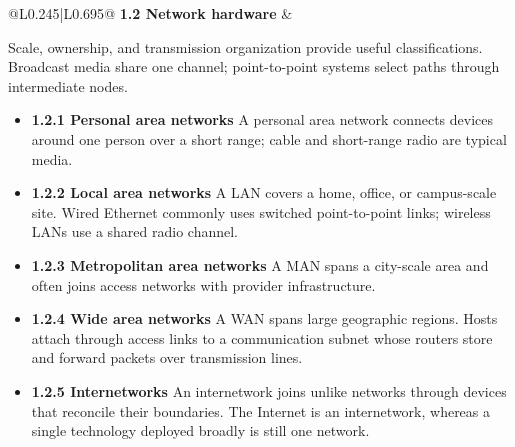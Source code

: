 \documentclass[10pt,letterpaper]{article}
\begin{document}
\begin{longtable}{@{}L{0.245\textwidth}|L{0.695\textwidth}@{}}
\textbf{1.2 Network hardware} & \begin{minipage}[t]{\linewidth}\raggedright Scale, ownership, and transmission organization provide useful classifications. Broadcast media share one channel; point-to-point systems select paths through intermediate nodes.\par\begin{itemize}\item \textbf{1.2.1 Personal area networks} A personal area network connects devices around one person over a short range; cable and short-range radio are typical media.\item \textbf{1.2.2 Local area networks} A LAN covers a home, office, or campus-scale site. Wired Ethernet commonly uses switched point-to-point links; wireless LANs use a shared radio channel.\item \textbf{1.2.3 Metropolitan area networks} A MAN spans a city-scale area and often joins access networks with provider infrastructure.\item \textbf{1.2.4 Wide area networks} A WAN spans large geographic regions. Hosts attach through access links to a communication subnet whose routers store and forward packets over transmission lines.\item \textbf{1.2.5 Internetworks} An internetwork joins unlike networks through devices that reconcile their boundaries. The Internet is an internetwork, whereas a single technology deployed broadly is still one network.\end{itemize}\end{minipage} \\ \hline

\end{longtable}
\end{document}
